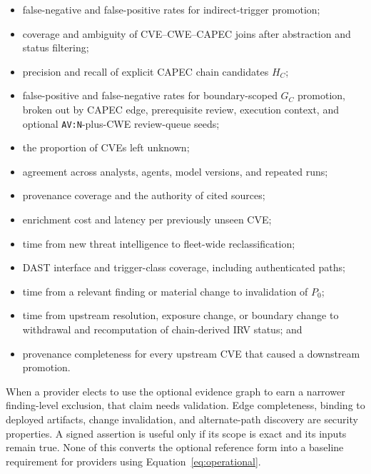 \documentclass[11pt]{article}
\newcommand{\code}[1]{\texttt{#1}}
\begin{document}
\begin{itemize}[leftmargin=1.5em,nosep]
\item false-negative and false-positive rates for indirect-trigger promotion;
\item coverage and ambiguity of CVE--CWE--CAPEC joins after abstraction and
  status filtering;
\item precision and recall of explicit CAPEC chain candidates $H_C$;
\item false-positive and false-negative rates for boundary-scoped $G_C$
  promotion, broken out by CAPEC edge, prerequisite review, execution context,
  and optional \code{AV:N}-plus-CWE review-queue seeds;
\item the proportion of CVEs left unknown;
\item agreement across analysts, agents, model versions, and repeated runs;
\item provenance coverage and the authority of cited sources;
\item enrichment cost and latency per previously unseen CVE;
\item time from new threat intelligence to fleet-wide reclassification;
\item DAST interface and trigger-class coverage, including authenticated paths;
\item time from a relevant finding or material change to invalidation of $P_0$;
\item time from upstream resolution, exposure change, or boundary change to
  withdrawal and recomputation of chain-derived IRV status; and
\item provenance completeness for every upstream CVE that caused a downstream
  promotion.
\end{itemize}

When a provider elects to use the optional evidence graph to earn a narrower
finding-level exclusion, that claim needs validation. Edge completeness,
binding to deployed artifacts, change invalidation, and alternate-path
discovery are security properties. A signed assertion is useful only if its
scope is exact and its inputs remain true. None of this converts the optional
reference form into a baseline requirement for providers using
Equation~\ref{eq:operational}.
\end{document}
